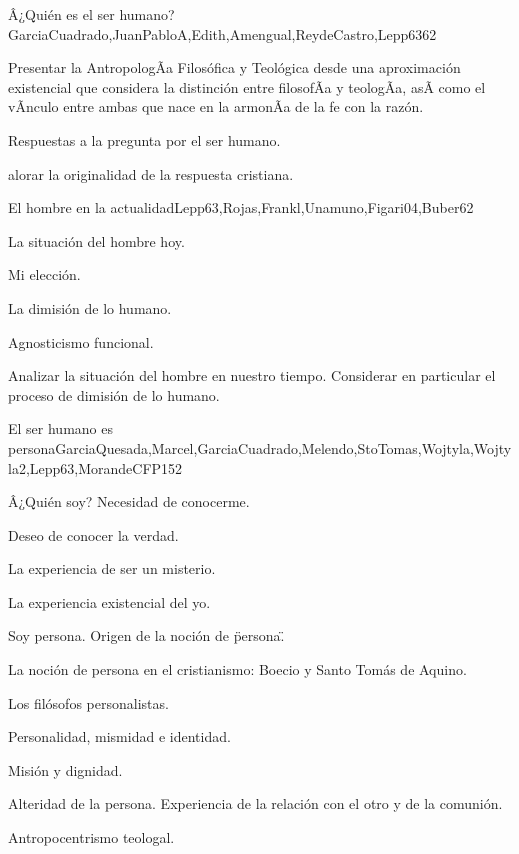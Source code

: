 \begin{syllabus}
\begin{unit}{Â¿Quién es el ser humano?}{GarciaCuadrado,JuanPabloA,Edith,Amengual,ReydeCastro,Lepp63}{6}{2}
\begin{unitgoals}
	\item Presentar la AntropologÃ­a Filosófica y Teológica desde una aproximación existencial que considera la distinción entre filosofÃ­a y teologÃ­a, asÃ­ como el vÃ­nculo entre ambas que nace en la armonÃ­a de la fe con la razón.
	\item Respuestas a la pregunta por el ser humano.
	\item alorar la originalidad de la respuesta cristiana.
\end{unitgoals}
\end{unit}

\begin{unit}{El hombre en la actualidad}{Lepp63,Rojas,Frankl,Unamuno,Figari04,Buber}{6}{2}
\begin{topics}
 		\item La situación del hombre hoy.
 		\item Mi elección.
 		\item La dimisión de lo humano.
 		\item Agnosticismo funcional.
\end{topics}

\begin{unitgoals}
	\item Analizar la situación del hombre en nuestro tiempo. Considerar en particular el proceso de dimisión de lo humano. 
\end{unitgoals}
\end{unit}

\begin{unit}{El ser humano es persona}{GarciaQuesada,Marcel,GarciaCuadrado,Melendo,StoTomas,Wojtyla,Wojtyla2,Lepp63,MorandeCFP}{15}{2}
\begin{topics}
 		\item Â¿Quién soy? Necesidad de conocerme.
 		\item Deseo de conocer la verdad.
 		\item La experiencia de ser un misterio.
 		\item La experiencia existencial del yo.
 		\item Soy persona. Origen de la noción de \"persona\".
 		\item La noción de persona en el cristianismo: Boecio y Santo Tomás de Aquino.
 		\item Los filósofos personalistas.
 		\item Personalidad, mismidad e identidad.
 		\item Misión y dignidad.
 		\item Alteridad de la persona. Experiencia de la relación con el otro y de la comunión.
 		\item Antropocentrismo teologal.
\end{topics}


\end{unit}
\end{syllabus}
